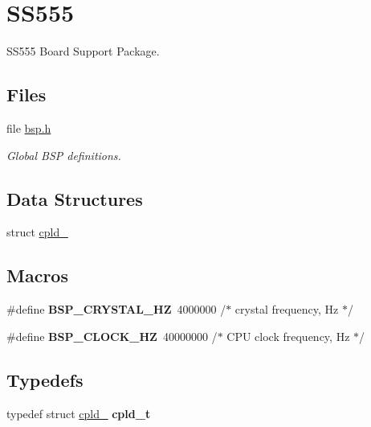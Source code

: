 \hypertarget{group__RTEMSBSPsPowerPCSS555}{}\section{S\+S555}
\label{group__RTEMSBSPsPowerPCSS555}


S\+S555 Board Support Package.  


\subsection*{Files}
\begin{DoxyCompactItemize}
\item 
file \mbox{\hyperlink{bsps_2powerpc_2ss555_2include_2bsp_8h}{bsp.\+h}}
\begin{DoxyCompactList}\small\item\em Global B\+SP definitions. \end{DoxyCompactList}\end{DoxyCompactItemize}
\subsection*{Data Structures}
\begin{DoxyCompactItemize}
\item 
struct \mbox{\hyperlink{structcpld__}{cpld\+\_\+}}
\end{DoxyCompactItemize}
\subsection*{Macros}
\begin{DoxyCompactItemize}
\item 
\mbox{\label{group__RTEMSBSPsPowerPCSS555_ga2de871df3e3258803e89dae108f191a9}} 
\#define {\bfseries B\+S\+P\+\_\+\+C\+R\+Y\+S\+T\+A\+L\+\_\+\+HZ}~4000000	/$\ast$ crystal frequency, Hz $\ast$/
\item 
\mbox{\label{group__RTEMSBSPsPowerPCSS555_ga5aaedb497c7cce1c42712e1cf6aaf5f1}} 
\#define {\bfseries B\+S\+P\+\_\+\+C\+L\+O\+C\+K\+\_\+\+HZ}~40000000	/$\ast$ C\+PU clock frequency, Hz $\ast$/
\end{DoxyCompactItemize}
\subsection*{Typedefs}
\begin{DoxyCompactItemize}
\item 
\mbox{\label{group__RTEMSBSPsPowerPCSS555_ga5426c68f6be25c52b81170752b7e749f}} 
typedef struct \mbox{\hyperlink{structcpld__}{cpld\+\_\+}} {\bfseries cpld\+\_\+t}
\end{DoxyCompactItemize}
